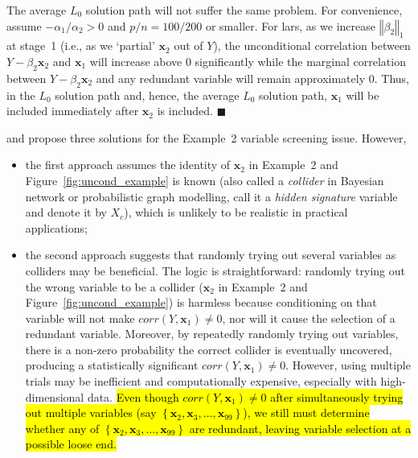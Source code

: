 \documentclass[11pt,review,authoryear]{elsarticle}
\begin{document}
The average $L_0$ solution path will not suffer the same problem. For convenience, assume $-\alpha_1 / \alpha_2 > 0$ and $p/n = 100/200$ or smaller. For lars, as we increase $\left\Vert \beta_2 \right\Vert_1$ at stage~1 (i.e., as we `partial' $\mathbf{x}_2$ out of $Y$), the unconditional correlation between $Y - \beta_2 \mathbf{x}_2$ and $\mathbf{x}_1$ will increase above $0$ significantly while the marginal correlation between $Y - \beta_2 \mathbf{x}_2$ and any redundant variable will remain approximately $0$. Thus, in the $L_0$ solution path and, hence, the average $L_0$ solution path, $\mathbf{x}_1$ will be included immediately after $\mathbf{x}_2$ is included. $\blacksquare$

\citet{fan2008sure} and \citet{barut2016conditional} propose three solutions for the Example~2 variable screening issue. However,

\begin{itemize}
  \item the first approach \citep[Section~2.2 and~3]{barut2016conditional} assumes the identity of $\mathbf{x}_2$ in Example~2 and Figure~\ref{fig:uncond_example} is known (also called a \emph{collider} in Bayesian network or probabilistic graph modelling, \citet{barut2016conditional} call it a \emph{hidden signature} variable and denote it by $X_c$), which is unlikely to be realistic in practical applications;
  \item the second approach \citep[Section~1 and~2.2]{barut2016conditional} suggests that randomly trying out several variables as colliders may be beneficial. The logic is straightforward: randomly trying out the wrong variable to be a collider ($\mathbf{x}_2$ in Example~2 and Figure~\ref{fig:uncond_example}) is harmless because conditioning on that variable will not make $corr(Y,\mathbf{x}_1) \neq 0$, nor will it cause the selection of a redundant variable. Moreover, by repeatedly randomly trying out variables, there is a non-zero probability the correct collider is eventually uncovered, producing a statistically significant $corr(Y,\mathbf{x}_1) \neq 0$. However, using multiple trials may be inefficient and computationally expensive, especially with high-dimensional data. \hl{Even though $corr(Y, \mathbf{x}_1) \neq 0$ after simultaneously trying out multiple variables (say $\left\{\mathbf{x}_2, \mathbf{x}_3, \ldots, \mathbf{x}_{99} \right\}$), we still must determine whether any of $\left\{\mathbf{x}_2, \mathbf{x}_3, \ldots, \mathbf{x}_{99} \right\}$ are redundant, leaving variable selection at a possible loose end.}
\end{itemize}
\end{document}
